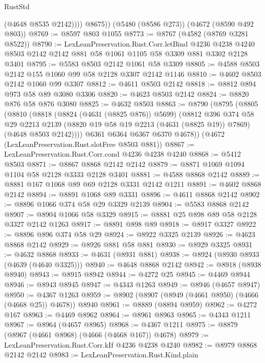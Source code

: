 \begin{lexlean}{RustStd}
\begin{coremodule}
              (@4648 @8535 @2142))))
        @8675))
    (@5480 (@8586 @273))
    (@4672 (@8590 @492 @803))
@8769 := @8597 @803 @1055
@8773 := @8767 (@4582 (@8769 @3281 @8522))
@8790 := LexLeanPreservation.Rust.Corr.letBind
    @4236
    @4238
    @4240
    @8503
    @2142
    @2142
    @881
    @58
    @1061
    @1105
    @58
    @3309
    @881
    @3302
    @2128
    @3401
@8795 := @5583 @8503 @2142 @1061 @58 @3309
@8805 := @4588 @8503 @2142 @155 @1060 @99 @58 @2128 @3307 @2142 @1146
@8810 := @4602 @8503 @2142 @1060 @99 @3307
@8812 := @4611 @8503 @2142
@8818 := @8812 @894 @973 @58 @89 @3080 @3306
@8820 := @4623 @8503 @2142
@8824 := @8820 @876 @58 @876 @3080
@8825 := @4632 @8503
@8863 := @8790
    (@8795
      (@8805
        (@8810
          (@8818
            (@8824 (@4631 (@8825 @876)) @5699)
            (@8812
              @396
              @374
              @58
              @29
              @2213
              @2139
              (@8820 @19 @58 @19 @2213 (@4631 (@8825 @19)) @7869)
              (@4648 @8503 @2142))))
        @6361
        @6364
        @6367
        @6370
        @4678))
    (@4672 (LexLeanPreservation.Rust.slotFree @8503 @881))
@8867 := LexLeanPreservation.Rust.Corr.cond @4236 @4238 @4240
@8868 := @5412 @8503
@8871 := @8867 @8868 @2142 @2142
@8879 := @8871 @1069 @1094 @1104 @58 @2128 @3333 @2128 @3401
@8881 := @4588 @8868 @2142
@8889 := @8881 @167 @1068 @89 @69 @2128 @3331 @2142 @1211
@8891 := @4602 @8868 @2142
@8894 := @8891 @1068 @89 @3331
@8896 := @4611 @8868 @2142
@8902 := @8896 @1066 @374 @58 @29 @3329 @2139
@8904 := @5583 @8868 @2142
@8907 := @8904 @1066 @58 @3329
@8915 := @8881 @25 @898 @89 @58 @2128 @3327 @2142 @1263
@8917 := @8891 @898 @89
@8918 := @8917 @3327
@8922 := @8896 @896 @374 @58 @29
@8924 := @8922 @3325 @2139
@8926 := @4623 @8868 @2142
@8929 := @8926 @881 @58 @881
@8930 := @8929 @3325
@8931 := @4632 @8868
@8933 := @4631 (@8931 @881)
@8938 := @8924 (@8930 @8933 (@4639 (@4640 @3325)))
@8940 := @4648 @8868 @2142
@8942 := @8918 (@8938 @8940)
@8943 := @8915 @8942
@8944 := @4272 @25
@8945 := @4469 @8944
@8946 := @8943 @8945
@8947 := @4343 @1263
@8949 := @8946 (@4657 @8947)
@8950 := @4367 @1263
@8959 := @8902 (@8907 (@8949 (@4661 @8950) (@4666 (@4668 @25)) @4678)) @8940
@8961 := @8889 (@8894 @8959)
@8962 := @4272 @167
@8963 := @4469 @8962
@8964 := @8961 @8963
@8965 := @4343 @1211
@8967 := @8964 (@4657 @8965)
@8968 := @4367 @1211
@8975 := @8879 (@8967 (@4661 @8968) (@4666 (@4668 @167)) @4678)
@8979 := LexLeanPreservation.Rust.Corr.kIf @4236 @4238 @4240
@8982 := @8979 @8868 @2142 @2142
@8983 := LexLeanPreservation.Rust.Kind.plain

\end{coremodule}
\end{lexlean}
